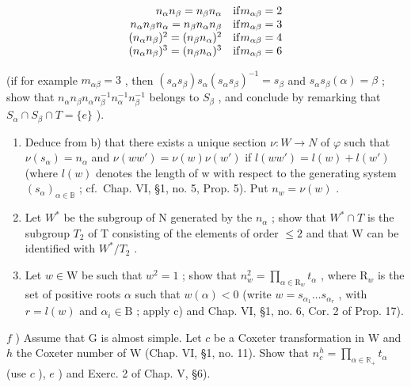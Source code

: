 \[
\begin{array}{r l} {n _ {\alpha} n _ {\beta} = n _ {\beta} n _ {\alpha}} & {\mathrm{if} m _ {\alpha \beta} = 2} \\ {n _ {\alpha} n _ {\beta} n _ {\alpha} = n _ {\beta} n _ {\alpha} n _ {\beta}} & {\mathrm{if} m _ {\alpha \beta} = 3} \\ {(n _ {\alpha} n _ {\beta}) ^ {2} = (n _ {\beta} n _ {\alpha}) ^ {2}} & {\mathrm{if} m _ {\alpha \beta} = 4} \\ {(n _ {\alpha} n _ {\beta}) ^ {3} = (n _ {\beta} n _ {\alpha}) ^ {3}} & {\mathrm{if} m _ {\alpha \beta} = 6} \end{array}
\]

(if for example \(m_{\alpha\beta}=3\) , then \((s_{\alpha}s_{\beta})s_{\alpha}(s_{\alpha}s_{\beta})^{-1}=s_{\beta}\) and \(s_{\alpha}s_{\beta}(\alpha)=\beta\) ; show that \(n_{\alpha}n_{\beta}n_{\alpha}n_{\beta}^{-1}n_{\alpha}^{-1}n_{\beta}^{-1}\) belongs to \(S_{\beta}\) , and conclude by remarking that \(S_{\alpha}\cap S_{\beta}\cap T=\{e\}\) ).

\begin{enumerate}
\def\labelenumi{\alph{enumi})}
\setcounter{enumi}{2}
\item
  Deduce from b) that there exists a unique section \(\nu: W \to N\) of \(\varphi\) such that \(\nu(s_{\alpha}) = n_{\alpha}\) and \(\nu(ww') = \nu(w)\nu(w')\) if \(l(ww') = l(w) + l(w')\) (where \(l(w)\) denotes the length of w with respect to the generating system \((s_{\alpha})_{\alpha \in \mathbb{B}}\) ; cf.~Chap. VI, §1, no. 5, Prop. 5). Put \(n_w = \nu(w)\) .
\item
  Let \(W^{*}\) be the subgroup of N generated by the \(n_{\alpha}\) ; show that \(W^{*} \cap T\) is the subgroup \(T_{2}\) of T consisting of the elements of order \(\leq 2\) and that W can be identified with \(W^{*}/T_{2}\) .
\item
  Let \(w \in \mathrm{W}\) be such that \(w^2 = 1\) ; show that \(n_w^2 = \prod_{\alpha \in \mathrm{R}_w} t_\alpha\) , where \(\mathrm{R}_w\) is the set of positive roots \(\alpha\) such that \(w(\alpha) < 0\) (write \(w = s_{\alpha_1} \ldots s_{\alpha_r}\) , with \(r = l(w)\) and \(\alpha_i \in \mathrm{B}\) ; apply c) and Chap. VI, §1, no. 6, Cor. 2 of Prop. 17).
\end{enumerate}

\(f\) ) Assume that \(\mathrm{G}\) is almost simple. Let \(c\) be a Coxeter transformation in \(\mathrm{W}\) and \(h\) the Coxeter number of \(\mathrm{W}\) (Chap. VI, §1, no. 11). Show that \(n_c^h = \prod_{\alpha \in \mathbb{R}_+}t_\alpha\) (use \(c\) ), \(e\) ) and Exerc. 2 of Chap. V, §6).

